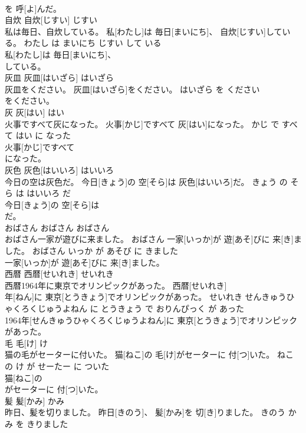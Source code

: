 \documentclass[8pt]{extreport}
\begin{document}
\begin{CJK}{UTF8}{min}
\\	を 呼[よ]んだ。		
\\	自炊	自炊[じすい]	じすい	
\\	私は毎日、自炊している。	私[わたし]は 毎日[まいにち]、 自炊[じすい]している。	わたし は まいにち じすい して いる	
\\	私[わたし]は 毎日[まいにち]、
\\	している。		
\\	灰皿	灰皿[はいざら]	はいざら	
\\	灰皿をください。	灰皿[はいざら]をください。	はいざら を ください	
\\	をください。		
\\	灰	灰[はい]	はい	
\\	火事ですべて灰になった。	火事[かじ]ですべて 灰[はい]になった。	かじ で すべて はい に なった	
\\	火事[かじ]ですべて
\\	になった。		
\\	灰色	灰色[はいいろ]	はいいろ	
\\	今日の空は灰色だ。	今日[きょう]の 空[そら]は 灰色[はいいろ]だ。	きょう の そら は はいいろ だ	
\\	今日[きょう]の 空[そら]は
\\	だ。		
\\	おばさん	おばさん	おばさん	
\\	おばさん一家が遊びに来ました。	おばさん 一家[いっか]が 遊[あそ]びに 来[き]ました。	おばさん いっか が あそび に きました	
\\	一家[いっか]が 遊[あそ]びに 来[き]ました。		
\\	西暦	西暦[せいれき]	せいれき	
\\	西暦1964年に東京でオリンピックがあった。	西暦[せいれき] 
\\	年[ねん]に 東京[とうきょう]でオリンピックがあった。	せいれき せんきゅうひゃくろくじゅうよねん に とうきょう で おりんぴっく が あった	
\\	1964年[せんきゅうひゃくろくじゅうよねん]に 東京[とうきょう]でオリンピックがあった。		
\\	毛	毛[け]	け	
\\	猫の毛がセーターに付いた。	猫[ねこ]の 毛[け]がセーターに 付[つ]いた。	ねこ の け が せーたー に ついた	
\\	猫[ねこ]の
\\	がセーターに 付[つ]いた。		
\\	髪	髪[かみ]	かみ	
\\	昨日、髪を切りました。	昨日[きのう]、 髪[かみ]を 切[き]りました。	きのう かみ を きりました	

\end{CJK}
\end{document}
